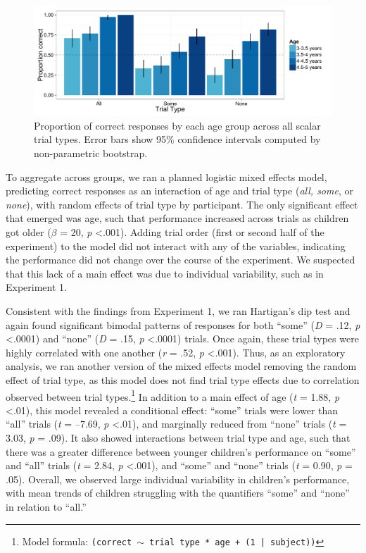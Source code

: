 \documentclass[man]{apa2}
\begin{document}
\begin{figure} 
 \begin{center} 
  \includegraphics[scale=.5]{figures/exp2_performance.pdf} 
  \caption{\label{fig:exp2_perf} Proportion of correct responses by each age group across all scalar trial types. Error bars show 95\% confidence intervals computed by non-parametric bootstrap.} 
 \end{center} 
\end{figure}


To aggregate across groups, we ran a planned logistic mixed effects model, predicting correct responses as an interaction of age and trial type (\textit{all, some}, or \textit{none}), with random effects of trial type by participant. The only significant effect that emerged was age, such that performance increased across trials as children got older ($\beta$ = 20, \textit{p} \textless  .001). Adding trial order (first or second half of the experiment) to the model did not interact with any of the variables, indicating the performance did not change over the course of the experiment. We suspected that this lack of a main effect was due to individual variability, such as in Experiment 1. 

Consistent with the findings from Experiment 1, we  ran Hartigan's dip test and again found significant bimodal patterns of responses for both ``some'' (\textit{D} = .12, \textit{p} \textless  .0001) and ``none'' (\textit{D} = .15, \textit{p} \textless  .0001) trials. Once again, these trial types were highly correlated with one another (\textit{r} = .52, \textit{p} \textless  .001). Thus, as an exploratory analysis, we ran another version of the mixed effects model removing the random effect of trial type, as this model does not find trial type effects due to correlation observed between trial types.\footnote{Model formula: \small{\tt{(correct $\sim$ trial type * age + (1 | subject))}}} In addition to a main effect of age (\textit{t} = 1.88, \textit{p} \textless  .01), this model revealed a conditional effect: ``some'' trials were lower than ``all'' trials (\textit{t} = --7.69, \textit{p} \textless  .01), and marginally reduced from ``none'' trials (\textit{t} = 3.03, \textit{p} = .09). It also showed interactions between trial type and age, such that there was a greater difference between younger children's performance on ``some'' and ``all'' trials (\textit{t} = 2.84, \textit{p} \textless  .001), and ``some'' and ``none'' trials (\textit{t} = 0.90, \textit{p} = .05). Overall, we observed large individual variability in children's performance, with mean trends of children struggling with the quantifiers ``some'' and ``none'' in relation to ``all.''
\end{document}
